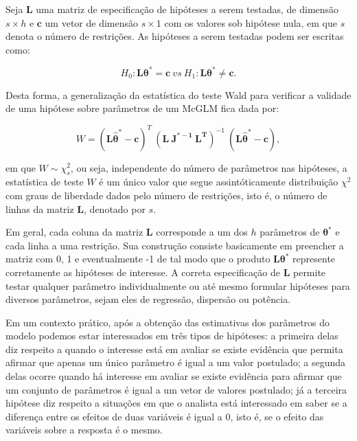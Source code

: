 Seja $\boldsymbol{L}$ uma matriz de especificação de hipóteses a serem testadas, de dimensão $s \times h$ e $\boldsymbol{c}$ um vetor de dimensão $s \times 1$ com os valores sob hipótese nula, em que $s$ denota o número de restrições. As hipóteses a serem testadas podem ser escritas como:

\begin{equation}
\label{eq:hipoteses_wald}
H_0: \boldsymbol{L}\boldsymbol{\theta^{*}} = \boldsymbol{c} \ vs \ H_1: \boldsymbol{L}\boldsymbol{\theta^{*}} \neq \boldsymbol{c}. 
\end{equation}

\noindent Desta forma, a generalização da estatística do teste Wald para verificar a validade de uma hipótese sobre parâmetros de um McGLM fica dada por:

$$
W = (\boldsymbol{L\hat\theta^{*}} - \boldsymbol{c})^T \ (\boldsymbol{L \ J^{\boldsymbol{*}-1} \ L^T})^{-1} \ (\boldsymbol{L\hat\theta^{*}} - \boldsymbol{c}),
$$

\noindent em que $W \sim \chi^2_s$, ou seja, independente do número de parâmetros nas hipóteses, a estatística de teste $W$ é um único valor que segue assintóticamente distribuição $\chi^2$ com graus de liberdade dados pelo número de restrições, isto é, o número de linhas da matriz $\boldsymbol{L}$, denotado por $s$.

Em geral, cada coluna da matriz $\boldsymbol{L}$ corresponde a um dos $h$ parâmetros de $\boldsymbol{\theta^{*}}$ e cada linha a uma restrição. Sua construção consiste basicamente em preencher a matriz com 0, 1 e eventualmente -1 de tal modo que o produto $\boldsymbol{L}\boldsymbol{\theta^{*}}$ represente corretamente as hipóteses de interesse. A correta especificação de $\boldsymbol{L}$ permite testar qualquer parâmetro individualmente ou até mesmo formular hipóteses para diversos parâmetros, sejam eles de regressão, dispersão ou potência.

Em um contexto prático, após a obtenção das estimativas dos parâmetros do modelo podemos estar interessados em três tipos de hipóteses: a primeira delas diz respeito a quando o interesse está em avaliar se existe evidência que permita afirmar que apenas um único parâmetro é igual a um valor postulado; a segunda delas ocorre quando há interesse em avaliar se existe evidência para afirmar que um conjunto de parâmetros é igual a um vetor de valores postulado; já a terceira hipótese diz respeito a situações em que o analista está interessado em saber se a diferença entre os efeitos de duas variáveis é igual a 0, isto é, se o efeito das variáveis sobre a resposta é o mesmo.

